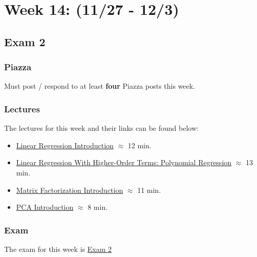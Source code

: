 \clearpage
\chapter{Week 14: (11/27 - 12/3)}

\section{Exam 2}

\subsection{Piazza}

Must post / respond to at least \textbf{four} Piazza posts this week.  

\subsection{Lectures}

The lectures for this week and their links can be found below:

\begin{itemize}
    \item \href{https://applied.cs.colorado.edu/mod/hvp/view.php?id=52239}{Linear Regression Introduction} $\approx$ 12 min.
    \item \href{https://applied.cs.colorado.edu/mod/hvp/view.php?id=52240}{Linear Regression With Higher-Order Terms: Polynomial Regression} $\approx$ 13 min.
    \item \href{https://applied.cs.colorado.edu/mod/hvp/view.php?id=52242}{Matrix Factorization Introduction} $\approx$ 11 min.
    \item \href{https://applied.cs.colorado.edu/mod/hvp/view.php?id=52241}{PCA Introduction} $\approx$ 8 min.
\end{itemize}

\subsection{Exam}

The exam for this week is \href{https://applied.cs.colorado.edu/mod/quiz/view.php?id=50818}{Exam 2}  
